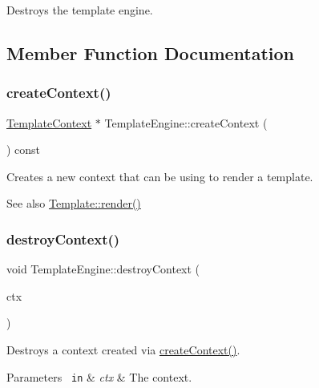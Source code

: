 Destroys the template engine. 

\subsection{Member Function Documentation}
\mbox{\label{class_template_engine_a2c0d83df212c210406dc78f74fe3f2ad}} 
\subsubsection{\texorpdfstring{createContext()}{createContext()}}
{\footnotesize\ttfamily \mbox{\hyperlink{class_template_context}{Template\+Context}} $\ast$ Template\+Engine\+::create\+Context (\begin{DoxyParamCaption}{ }\end{DoxyParamCaption}) const}

Creates a new context that can be using to render a template. \begin{DoxySeeAlso}{See also}
\mbox{\hyperlink{class_template_af9582cccc21e9aea39bd3fdbc609b03c}{Template\+::render()}} 
\end{DoxySeeAlso}
\mbox{\label{class_template_engine_ae3bbdafa4c8c0c912f64300643d0b37f}} 
\subsubsection{\texorpdfstring{destroyContext()}{destroyContext()}}
{\footnotesize\ttfamily void Template\+Engine\+::destroy\+Context (\begin{DoxyParamCaption}\item[{\mbox{\hyperlink{class_template_context}{Template\+Context}} $\ast$}]{ctx }\end{DoxyParamCaption})}

Destroys a context created via \mbox{\hyperlink{class_template_engine_a2c0d83df212c210406dc78f74fe3f2ad}{create\+Context()}}. 
\begin{DoxyParams}[1]{Parameters}
\mbox{\texttt{ in}}  & {\em ctx} & The context. \\
\hline
\end{DoxyParams}
\mbox{\label{class_template_engine_a518bcc65a14287f897eebad289ecdd11}} 

